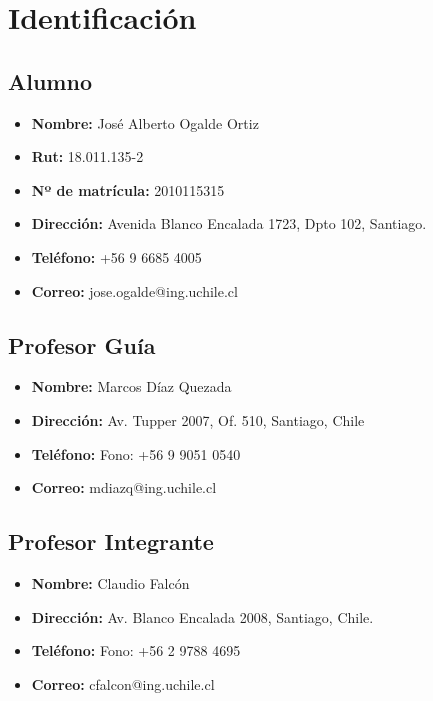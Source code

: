\documentclass[11pt,letterpaper]{article}
\begin{document}
\section{Identificación}

\subsection{Alumno}

\begin{itemize}
	\item \textbf{Nombre:} Jos\'e Alberto Ogalde Ortiz
	\item \textbf{Rut:} 18.011.135-2
	\item \textbf{Nº de matrícula:} 2010115315
	\item \textbf{Dirección:} Avenida Blanco Encalada 1723, Dpto 102, Santiago.
	\item \textbf{Tel\'efono:} +56 9 6685 4005
	\item \textbf{Correo:} jose.ogalde@ing.uchile.cl
\end{itemize}

\subsection{Profesor Guía}

\begin{itemize}
	\item \textbf{Nombre:} Marcos Díaz Quezada
	\item \textbf{Dirección:} Av. Tupper 2007, Of. 510, Santiago, Chile
	\item \textbf{Teléfono:} Fono: +56 9 9051 0540
	\item \textbf{Correo:} mdiazq@ing.uchile.cl
\end{itemize}

\subsection{Profesor Integrante}

\begin{itemize}
	\item \textbf{Nombre:} Claudio Falcón
	\item \textbf{Dirección:} Av. Blanco  Encalada 2008, Santiago, Chile.
	\item \textbf{Teléfono:} Fono: +56 2 9788 4695
	\item \textbf{Correo:} cfalcon@ing.uchile.cl
\end{itemize}
\end{document}
